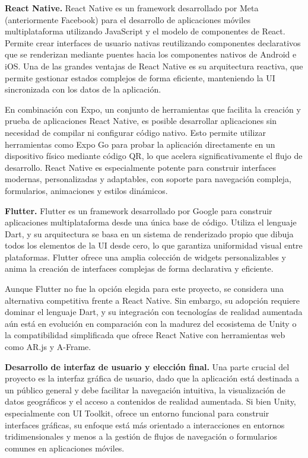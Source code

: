 \textbf{React Native.} React Native es un framework desarrollado por Meta (anteriormente Facebook) para el desarrollo de aplicaciones móviles multiplataforma utilizando JavaScript y el modelo de componentes de React. Permite crear interfaces de usuario nativas reutilizando componentes declarativos que se renderizan mediante puentes hacia los componentes nativos de Android e iOS. Una de las grandes ventajas de React Native es su arquitectura reactiva, que permite gestionar estados complejos de forma eficiente, manteniendo la UI sincronizada con los datos de la aplicación.

En combinación con Expo, un conjunto de herramientas que facilita la creación y prueba de aplicaciones React Native, es posible desarrollar aplicaciones sin necesidad de compilar ni configurar código nativo. Esto permite utilizar herramientas como Expo Go para probar la aplicación directamente en un dispositivo físico mediante código QR, lo que acelera significativamente el flujo de desarrollo. React Native es especialmente potente para construir interfaces modernas, personalizadas y adaptables, con soporte para navegación compleja, formularios, animaciones y estilos dinámicos.

\textbf{Flutter.} Flutter es un framework desarrollado por Google para construir aplicaciones multiplataforma desde una única base de código. Utiliza el lenguaje Dart, y su arquitectura se basa en un sistema de renderizado propio que dibuja todos los elementos de la UI desde cero, lo que garantiza uniformidad visual entre plataformas. Flutter ofrece una amplia colección de widgets personalizables y anima la creación de interfaces complejas de forma declarativa y eficiente.

Aunque Flutter no fue la opción elegida para este proyecto, se considera una alternativa competitiva frente a React Native. Sin embargo, su adopción requiere dominar el lenguaje Dart, y su integración con tecnologías de realidad aumentada aún está en evolución en comparación con la madurez del ecosistema de Unity o la compatibilidad simplificada que ofrece React Native con herramientas web como AR.js y A-Frame.

\textbf{Desarrollo de interfaz de usuario y elección final.} Una parte crucial del proyecto es la interfaz gráfica de usuario, dado que la aplicación está destinada a un público general y debe facilitar la navegación intuitiva, la visualización de datos geográficos y el acceso a contenidos de realidad aumentada. Si bien Unity, especialmente con UI Toolkit, ofrece un entorno funcional para construir interfaces gráficas, su enfoque está más orientado a interacciones en entornos tridimensionales y menos a la gestión de flujos de navegación o formularios comunes en aplicaciones móviles.

